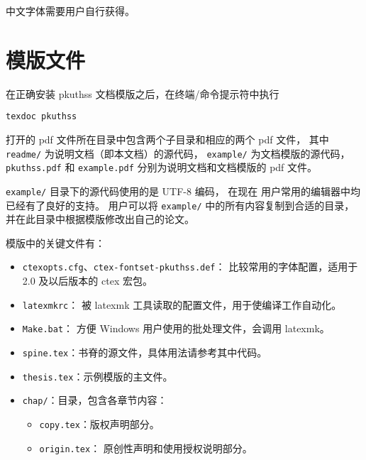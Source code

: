 中文字体需要用户自行获得。

\section{模版文件}\label{sec:doc-dir}

在正确安装 pkuthss 文档模版之后，在终端/命令提示符中执行
\begin{Verbatim}
texdoc pkuthss
\end{Verbatim}
打开的 pdf 文件所在目录中包含两个子目录和相应的两个 pdf 文件，
其中 \verb|readme/| 为说明文档（即本文档）的源代码，%
\verb|example/| 为文档模版的源代码，%
\verb|pkuthss.pdf| 和 \verb|example.pdf|
分别为说明文档和文档模版的 pdf 文件。

\verb|example/| 目录下的源代码使用的是 UTF-8 编码，
在现在  用户常用的编辑器中均已经有了良好的支持。
用户可以将 \verb|example/| 中的所有内容复制到合适的目录，
并在此目录中根据模版修改出自己的论文。


模版中的关键文件有：
\begin{itemize}
	\item \verb|ctexopts.cfg|、\verb|ctex-fontset-pkuthss.def|：
		比较常用的字体配置，适用于 2.0 及以后版本的
		ctex 宏包。
	\item \verb|latexmkrc|：
		被 latexmk 工具读取的配置文件，用于使编译工作自动化。
	\item \verb|Make.bat|：%
		方便 Windows 用户使用的批处理文件，会调用 latexmk。
	\item \verb|spine.tex|：书脊的源文件，具体用法请参考其中代码。
	\item \verb|thesis.tex|：示例模版的主文件。

	\item \verb|chap/|：目录，包含各章节内容：
	\begin{itemize}
		\item \verb|copy.tex|：版权声明部分。
		\item \verb|origin.tex|：
			原创性声明和使用授权说明部分。
	\end{itemize}
\end{itemize}

